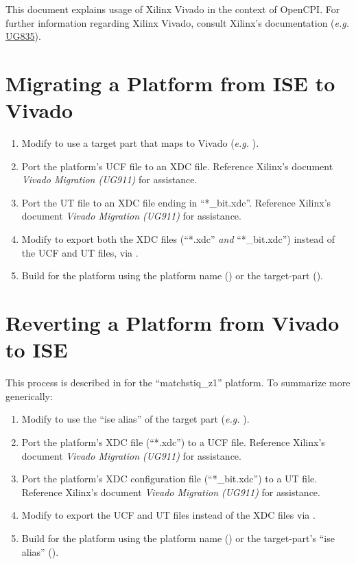 \begin{flushleft}
This document explains usage of Xilinx Vivado in the context of OpenCPI. For further information regarding Xilinx Vivado, consult Xilinx's documentation (\textit{e.g.} \href{https://www.xilinx.com/support/documentation/sw_manuals/xilinx2017_1/ug835-vivado-tcl-commands.pdf}{UG835}).
\section{Migrating a Platform from ISE to Vivado}
\begin{enumerate}
\item Modify  to use a target part that maps to Vivado (\textit{e.g.} ).
\item Port the platform's UCF file to an XDC file. Reference Xilinx's document \textit{Vivado Migration (UG911)} for assistance.
\item Port the UT file to an XDC file ending in ``*\_bit.xdc''. Reference Xilinx's document \textit{Vivado Migration (UG911)} for assistance.
\item Modify  to export both the XDC files (``*.xdc'' \textit{and} ``*\_bit.xdc'') instead of the UCF and UT files, via .
\item Build for the platform using the platform name () or the target-part ().
\end{enumerate}

\section{Reverting a Platform from Vivado to ISE}
This process is described in  for the ``matchstiq\_z1'' platform. To summarize more generically:
\begin{enumerate}
\item Modify  to use the ``ise alias'' of the target part (\textit{e.g.} ).
\item{Port the platform's XDC file (``*.xdc'') to a UCF file. Reference Xilinx's document \textit{Vivado Migration (UG911)} for assistance}.
\item{Port the platform's XDC configuration file (``*\_bit.xdc'') to a UT file. Reference Xilinx's document \textit{Vivado Migration (UG911)} for assistance}.
\item Modify  to export the UCF and UT files instead of the XDC files via .
\item Build for the platform using the platform name () or the target-part's ``ise alias'' ().
\end{enumerate}


\end{flushleft}
